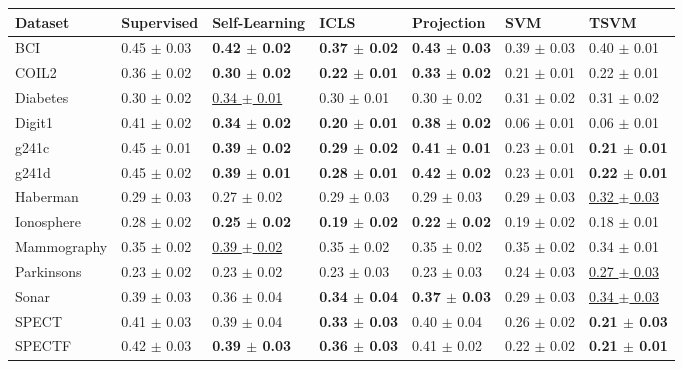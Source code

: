 \begin{table}[ht]
\centering
\begin{tabular}{lllllll}
  \hline
Dataset & Supervised & Self-Learning & ICLS & Projection & SVM & TSVM \\ 
  \hline
BCI & 0.45 $\pm$ 0.03 & \textbf{0.42 $\pm$ 0.02} & \textbf{0.37 $\pm$ 0.02} & \textbf{0.43 $\pm$ 0.03} & 0.39 $\pm$ 0.03 & 0.40 $\pm$ 0.01 \\ 
  COIL2 & 0.36 $\pm$ 0.02 & \textbf{0.30 $\pm$ 0.02} & \textbf{0.22 $\pm$ 0.01} & \textbf{0.33 $\pm$ 0.02} & 0.21 $\pm$ 0.01 & 0.22 $\pm$ 0.01 \\ 
  Diabetes & 0.30 $\pm$ 0.02 & \underline{0.34 $\pm$ 0.01} & 0.30 $\pm$ 0.01 & 0.30 $\pm$ 0.02 & 0.31 $\pm$ 0.02 & 0.31 $\pm$ 0.02 \\ 
  Digit1 & 0.41 $\pm$ 0.02 & \textbf{0.34 $\pm$ 0.02} & \textbf{0.20 $\pm$ 0.01} & \textbf{0.38 $\pm$ 0.02} & 0.06 $\pm$ 0.01 & 0.06 $\pm$ 0.01 \\ 
  g241c & 0.45 $\pm$ 0.01 & \textbf{0.39 $\pm$ 0.02} & \textbf{0.29 $\pm$ 0.02} & \textbf{0.41 $\pm$ 0.01} & 0.23 $\pm$ 0.01 & \textbf{0.21 $\pm$ 0.01} \\ 
  g241d & 0.45 $\pm$ 0.02 & \textbf{0.39 $\pm$ 0.01} & \textbf{0.28 $\pm$ 0.01} & \textbf{0.42 $\pm$ 0.02} & 0.23 $\pm$ 0.01 & \textbf{0.22 $\pm$ 0.01} \\ 
  Haberman & 0.29 $\pm$ 0.03 & 0.27 $\pm$ 0.02 & 0.29 $\pm$ 0.03 & 0.29 $\pm$ 0.03 & 0.29 $\pm$ 0.03 & \underline{0.32 $\pm$ 0.03} \\ 
  Ionosphere & 0.28 $\pm$ 0.02 & \textbf{0.25 $\pm$ 0.02} & \textbf{0.19 $\pm$ 0.02} & \textbf{0.22 $\pm$ 0.02} & 0.19 $\pm$ 0.02 & 0.18 $\pm$ 0.01 \\ 
  Mammography & 0.35 $\pm$ 0.02 & \underline{0.39 $\pm$ 0.02} & 0.35 $\pm$ 0.02 & 0.35 $\pm$ 0.02 & 0.35 $\pm$ 0.02 & 0.34 $\pm$ 0.01 \\ 
  Parkinsons & 0.23 $\pm$ 0.02 & 0.23 $\pm$ 0.02 & 0.23 $\pm$ 0.03 & 0.23 $\pm$ 0.03 & 0.24 $\pm$ 0.03 & \underline{0.27 $\pm$ 0.03} \\ 
  Sonar & 0.39 $\pm$ 0.03 & 0.36 $\pm$ 0.04 & \textbf{0.34 $\pm$ 0.04} & \textbf{0.37 $\pm$ 0.03} & 0.29 $\pm$ 0.03 & \underline{0.34 $\pm$ 0.03} \\ 
  SPECT & 0.41 $\pm$ 0.03 & 0.39 $\pm$ 0.04 & \textbf{0.33 $\pm$ 0.03} & 0.40 $\pm$ 0.04 & 0.26 $\pm$ 0.02 & \textbf{0.21 $\pm$ 0.03} \\ 
  SPECTF & 0.42 $\pm$ 0.03 & \textbf{0.39 $\pm$ 0.03} & \textbf{0.36 $\pm$ 0.03} & 0.41 $\pm$ 0.02 & 0.22 $\pm$ 0.02 & \textbf{0.21 $\pm$ 0.01} \\ 

\end{tabular}
\end{table}
